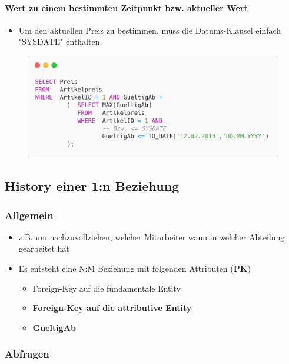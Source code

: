 \paragraph{Wert zu einem bestimmten Zeitpunkt bzw. aktueller Wert}
\begin{itemize}
    \item Um den aktuellen Preis zu bestimmen, muss die Datums-Klausel einfach "SYSDATE" enthalten.
\end{itemize}
\begin{figure}[H]
    \centering
    \includegraphics[width=\textwidth]{res/themenkorb_4/history_attribute.png}
\end{figure}

\subsection{History einer 1:n Beziehung}
\subsubsection{Allgemein}
\begin{itemize}
    \item z.B. um nachzuvollziehen, welcher Mitarbeiter wann in welcher Abteilung gearbeitet hat
    \item Es entsteht eine N:M Beziehung mit folgenden Attributen (\textbf{PK})
    \begin{itemize}
        \item Foreign-Key auf die fundamentale Entity
        \item \textbf{Foreign-Key auf die attributive Entity}
        \item \textbf{GueltigAb}
    \end{itemize}
\end{itemize}
\subsubsection{Abfragen}
